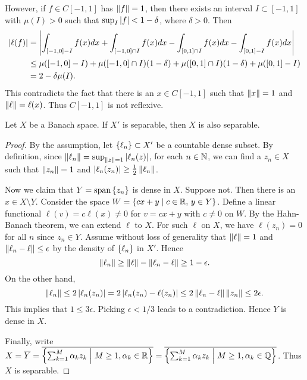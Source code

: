 \begin{example}
    However, if $f\in C[-1,1]$ has $\left\lVert {f} \right\rVert = 1$, then there exists 
    an interval $I\subset[-1,1]$ with $\mu(I)>0$ such that $\sup_I \left\lvert {f} \right\rvert< 1-\delta$, 
    where $\delta>0$. Then 
    \begin{equation*}
        \begin{split}
            \left\lvert {\ell(f)} \right\rvert &= \left\lvert {\int_{[-1,0]-I} f(x)dx + \int_{[-1,0]\cap I} f(x)dx - \int_{[0,1]\cap I} f(x)dx - \int_{[0,1]-I} f(x)dx} \right\rvert \\
            &\leq \mu([-1,0]-I) + \mu([-1,0]\cap I)(1-\delta) + \mu([0,1]\cap I)(1-\delta) + \mu([0,1]-I) \\
            &= 2-\delta\mu(I). 
        \end{split}
    \end{equation*}
    This contradicts the fact that there is an $x\in C[-1,1]$ 
    such that $\left\lVert {x} \right\rVert = 1$ and $\left\lVert {\ell} \right\rVert = \ell(x)$. Thus 
    $C[-1,1]$ is not reflexive.
\end{example}

\begin{theorem}\label{thm:dual_separable}
    Let $X$ be a Banach space. If $X'$ is separable, then $X$ 
    is also separable.
\end{theorem}
\begin{proof}
    By the assumption, let $\left\{ {\ell_n} \right\}\subset X'$ be a countable 
    dense subset. By definition, since $\left\lVert {\ell_n} \right\rVert = \sup_{\left\lVert {z} \right\rVert=1}\left\lvert {\ell_n(z)} \right\rvert$, 
    for each $n\in\mathbb{N}$, we can find a $z_n\in X$ such that $\left\lVert {z_n} \right\rVert = 1$ and 
    $\left\lvert {\ell_n(z_n)} \right\rvert \geq \frac{1}{2}\left\lVert {\ell_n} \right\rVert$. 
    
    Now we claim that $Y = \operatorname{span}\left\{ {z_n} \right\}$ is dense in $X$. 
    Suppose not. Then there is an $x\in X\setminus Y$. Consider 
    the space $W = \left\{ cx+y \;\middle\vert\; c\in\mathbb{R},\, y\in Y \right\}$. Define a linear 
    functional $\ell(v) = c\ell(x)\neq 0$ for $v = cx+y$ with $c\neq 0$ 
    on $W$. By the Hahn-Banach theorem, we can extend $\ell$ to $X$. 
    For such $\ell$ on $X$, we have $\ell(z_n) = 0$ for all $n$ since 
    $z_n\in Y$. Assume without loss of generality that $\left\lVert {\ell} \right\rVert = 1$ 
    and $\left\lVert {\ell_n-\ell} \right\rVert\leq\epsilon$ by the density of $\left\{ {\ell_n} \right\}$ 
    in $X'$. Hence 
    \begin{equation*}
        \left\lVert {\ell_n} \right\rVert \geq \left\lVert {\ell} \right\rVert - \left\lVert {\ell_n-\ell} \right\rVert \geq 1-\epsilon.
    \end{equation*}
    On the other hand, 
    \begin{equation*}
        \left\lVert {\ell_n} \right\rVert\leq 2\left\lvert {\ell_n(z_n)} \right\rvert = 2\left\lvert {\ell_n(z_n) - \ell(z_n)} \right\rvert 
        \leq 2\left\lVert {\ell_n-\ell} \right\rVert\left\lVert {z_n} \right\rVert \leq 2\epsilon.
    \end{equation*}
    This implies that $1\leq 3\epsilon$. Picking $\epsilon<1/3$ leads 
    to a contradiction. Hence $Y$ is dense in $X$. 

    Finally, write $X = \overline{Y} = \overline{\left\{ \sum_{k=1}^{M}\alpha_kz_k \;\middle\vert\; M\geq 1, \alpha_k\in\mathbb{R} \right\}} 
    = \overline{\left\{ \sum_{k=1}^{M}\alpha_kz_k \;\middle\vert\; M\geq 1, \alpha_k\in\mathbb{Q} \right\}}$. 
    Thus $X$ is separable. 
\end{proof}

